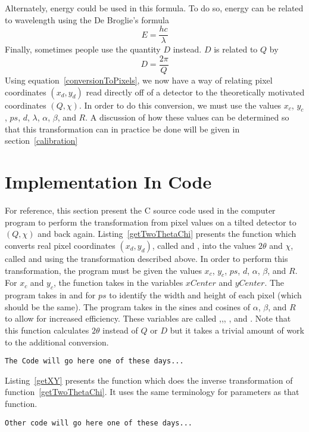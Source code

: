 Alternately, energy could be used in this formula.
To do so, energy can be related to wavelength using
the De Broglie's formula
\begin{equation}
E = \frac{hc}{\lambda}
\end{equation}
Finally, sometimes people use the quantity $D$ instead.
$D$ is related to $Q$ by
\begin{equation}\label{DtermsQ}
    D = \frac{2\pi}{Q}
\end{equation}
Using equation~\ref{conversionToPixels},
we now have a way of relating pixel
coordinates $(x_d,y_d)$ read directly off
of a detector to the
theoretically motivated coordinates $(Q,\chi)$.
In order to do this conversion, we must use
the values $x_c$, $y_c$, $ps$, $d$, $\lambda$,
$\alpha$, $\beta$, and $R$. A discussion of
how these values can be determined so that
this transformation can in practice be done
will be given in section~\ref{calibration}


\section{Implementation In Code}

For reference, this section present the C source 
code used in the computer program to perform the 
transformation from pixel values on a tilted 
detector to $(Q,\chi)$ and back again. 
Listing~\ref{getTwoThetaChi} presents the function
 which converts real pixel
coordinates $(x_d,y_d)$, called 
and , into the values $2\theta$ and $\chi$, 
called  and  using the 
transformation described above. In order to perform 
this transformation, the program must be given
the values $x_c$, $y_c$, $ps$, $d$, 
$\alpha$, $\beta$, and $R$. For $x_c$ and $y_c$, 
the function takes in the variables $xCenter$ and
$yCenter$. The program takes in  
and  for $ps$ to identify the
width and height of each pixel (which should be the 
same). The program takes in the sines and cosines
of $\alpha$, $\beta$, and $R$ to allow for increased
efficiency. These variables are called 
,,,
, and . 
Note that this function calculates $2\theta$ instead
of $Q$ or $D$ but it takes a trivial amount of work
to the additional conversion.
\begin{lstlisting}[caption={Code to convert pixel coordinates on a real detector into $(Q,\chi)$ coordinates},label=getTwoThetaChi]
The Code will go here one of these days...
\end{lstlisting}
Listing~\ref{getXY} presents the function  
which does the inverse transformation of 
function~\ref{getTwoThetaChi}. It uses the same
terminology for parameters as that function.

\begin{lstlisting}[caption={Code to convert $(Q,\chi)$ values into pixel coordinates on a real detector},label=getXY]
Other code will go here one of these days...
\end{lstlisting}



